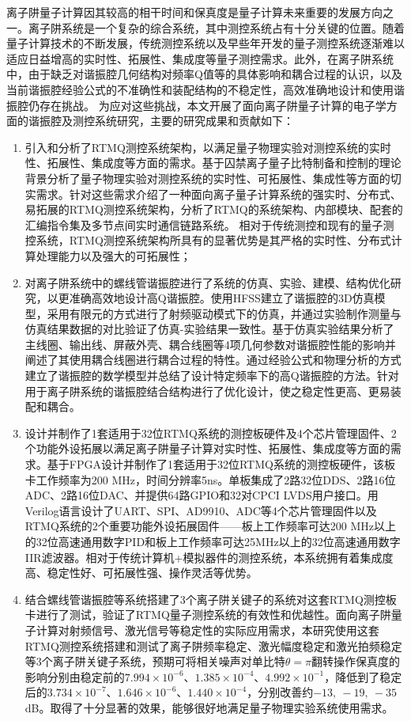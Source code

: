 
\begin{conclusion}

离子阱量子计算因其较高的相干时间和保真度是量子计算未来重要的发展方向之一。离子阱系统是一个复杂的综合系统，其中测控系统占有十分关键的位置。随着量子计算技术的不断发展，传统测控系统以及早些年开发的量子测控系统逐渐难以适应日益增高的实时性、拓展性、集成度等量子测控需求。此外，在离子阱系统中，由于缺乏对谐振腔几何结构对频率Q值等的具体影响和耦合过程的认识，以及当前谐振腔经验公式的不准确性和装配结构的不稳定性，高效准确地设计和使用谐振腔仍存在挑战。
为应对这些挑战，本文开展了面向离子阱量子计算的电子学方面的谐振腔及测控系统研究，主要的研究成果和贡献如下：
\begin{enumerate}
    \item 引入和分析了RTMQ测控系统架构，以满足量子物理实验对测控系统的实时性、拓展性、集成度等方面的需求。基于囚禁离子量子比特制备和控制的理论背景分析了量子物理实验对测控系统的实时性、可拓展性、集成性等方面的切实需求。针对这些需求介绍了一种面向离子量子计算系统的强实时、分布式、易拓展的RTMQ测控系统架构，分析了RTMQ的系统架构、内部模块、配套的汇编指令集及多节点间实时通信链路系统。
    相对于传统测控和现有的量子测控系统，RTMQ测控系统架构所具有的显著优势是其严格的实时性、分布式计算处理能力以及强大的可拓展性；
    \item 对离子阱系统中的螺线管谐振腔进行了系统的仿真、实验、建模、结构优化研究，以更准确高效地设计高Q谐振腔。使用HFSS建立了谐振腔的3D仿真模型，采用有限元的方式进行了射频驱动模式下的仿真，并通过实验制作测量与仿真结果数据的对比验证了仿真-实验结果一致性。基于仿真实验结果分析了主线圈、输出线、屏蔽外壳、耦合线圈等4项几何参数对谐振腔性能的影响并阐述了其使用耦合线圈进行耦合过程的特性。通过经验公式和物理分析的方式建立了谐振腔的数学模型并总结了设计特定频率下的高Q谐振腔的方法。针对用于离子阱系统的谐振腔结合结构进行了优化设计，使之稳定性更高、更易装配和耦合。
    \item 设计并制作了1套适用于32位RTMQ系统的测控板硬件及4个芯片管理固件、2个功能外设拓展以满足离子阱量子计算对实时性、拓展性、集成度等方面的需求。基于FPGA设计并制作了1套适用于32位RTMQ系统的测控板硬件，该板卡工作频率为200 MHz，时间分辨率5ns。单板集成了2路32位DDS、2路16位ADC、2路16位DAC、并提供64路GPIO和32对CPCI LVDS用户接口。用Verilog语言设计了UART、SPI、AD9910、ADC等4个芯片管理固件以及RTMQ系统的2个重要功能外设拓展固件——板上工作频率可达200 MHz以上的32位高速通用数字PID和板上工作频率可达25MHz以上的32位高速通用数字IIR滤波器。相对于传统计算机+模拟器件的测控系统，本系统拥有着集成度高、稳定性好、可拓展性强、操作灵活等优势。
    \item 结合螺线管谐振腔等系统搭建了3个离子阱关键子的系统对这套RTMQ测控板卡进行了测试，验证了RTMQ量子测控系统的有效性和优越性。面向离子阱量子计算对射频信号、激光信号等稳定性的实际应用需求，本研究使用这套RTMQ测控系统搭建和测试了离子阱频率稳定、激光幅度稳定和激光拍频稳定等3个离子阱关键子系统，预期可将相关噪声对单比特$\theta=\pi$翻转操作保真度的影响分别由稳定前的$7.994\times10^{-6}$、$1.385\times 10^{-4}$、$4.992\times 10^{-1}$，降低到了稳定后的$3.734\times10^{-7}$、$1.646\times 10^{-6}$、$1.440\times 10^{-4}$，分别改善约$-13,\ -19,\ -35$ dB。取得了十分显著的效果，能够很好地满足量子物理实验系统使用需求。
  \end{enumerate}


\end{conclusion}
